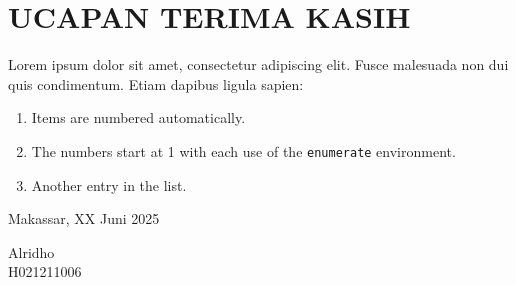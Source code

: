 \begingroup
\chapter*{UCAPAN TERIMA KASIH}
\noindent
\lipsum[1] \par
\lipsum[2] \par
Lorem ipsum dolor sit amet, consectetur adipiscing elit. Fusce
malesuada non dui quis condimentum. Etiam dapibus ligula sapien:
\begin{enumerate}
  \item Items are numbered automatically.
  \item The numbers start at 1 with each use of the
    \texttt{enumerate} environment.
  \item Another entry in the list.\\
\end{enumerate}

\vspace{2cm}

\hfill
\begin{minipage}{0.4\textwidth}
  \raggedleft
  Makassar, XX Juni 2025 \par
  \vspace{2cm}
  Alridho \\
  H021211006
\end{minipage}
\endgroup
